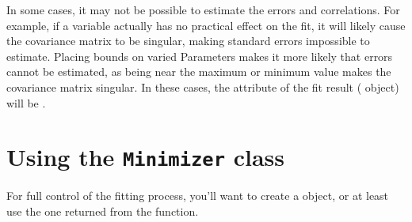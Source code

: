 \documentclass[letterpaper,10pt,english]{sphinxmanual}
\begin{document}
In some cases, it may not be possible to estimate the errors and
correlations.  For example, if a variable actually has no practical effect
on the fit, it will likely cause the covariance matrix to be singular,
making standard errors impossible to estimate.  Placing bounds on varied
Parameters makes it more likely that errors cannot be estimated, as being
near the maximum or minimum value makes the covariance matrix singular.  In
these cases, the  attribute of the fit result
({\hyperref[fitting:Minimizer]{}} object) will be .


\section{Using the \texttt{Minimizer} class}
\label{fitting:fit-minimizer-label}\label{fitting:using-the-minimizer-class}
For full control of the fitting process, you'll want to create a
{\hyperref[fitting:Minimizer]{}} object, or at least use the one returned from the
{\hyperref[fitting:minimize]{}} function.
\end{document}
